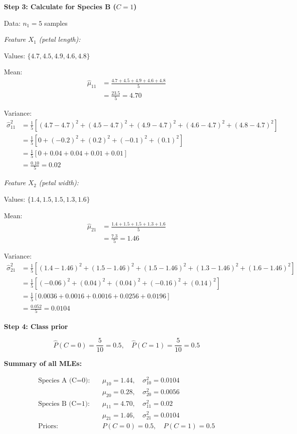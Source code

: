 \documentclass[12pt]{article}
\begin{document}
\begin{solution}
\textbf{Step 3: Calculate for Species B ($C = 1$)}

Data: $n_1 = 5$ samples

\textit{Feature $X_1$ (petal length):}

Values: $\{4.7, 4.5, 4.9, 4.6, 4.8\}$

Mean:
\begin{align}
\hat{\mu}_{11} &= \frac{4.7 + 4.5 + 4.9 + 4.6 + 4.8}{5} \\
&= \frac{23.5}{5} = 4.70
\end{align}

Variance:
\begin{align}
\hat{\sigma}_{11}^2 &= \frac{1}{5}\left[(4.7-4.7)^2 + (4.5-4.7)^2 + (4.9-4.7)^2 + (4.6-4.7)^2 + (4.8-4.7)^2\right] \\
&= \frac{1}{5}\left[0 + (-0.2)^2 + (0.2)^2 + (-0.1)^2 + (0.1)^2\right] \\
&= \frac{1}{5}\left[0 + 0.04 + 0.04 + 0.01 + 0.01\right] \\
&= \frac{0.10}{5} = 0.02
\end{align}

\textit{Feature $X_2$ (petal width):}

Values: $\{1.4, 1.5, 1.5, 1.3, 1.6\}$

Mean:
\begin{align}
\hat{\mu}_{21} &= \frac{1.4 + 1.5 + 1.5 + 1.3 + 1.6}{5} \\
&= \frac{7.3}{5} = 1.46
\end{align}

Variance:
\begin{align}
\hat{\sigma}_{21}^2 &= \frac{1}{5}\left[(1.4-1.46)^2 + (1.5-1.46)^2 + (1.5-1.46)^2 + (1.3-1.46)^2 + (1.6-1.46)^2\right] \\
&= \frac{1}{5}\left[(-0.06)^2 + (0.04)^2 + (0.04)^2 + (-0.16)^2 + (0.14)^2\right] \\
&= \frac{1}{5}\left[0.0036 + 0.0016 + 0.0016 + 0.0256 + 0.0196\right] \\
&= \frac{0.052}{5} = 0.0104
\end{align}

\textbf{Step 4: Class prior}

\[
\hat{P}(C = 0) = \frac{5}{10} = 0.5, \quad \hat{P}(C = 1) = \frac{5}{10} = 0.5
\]

\textbf{Summary of all MLEs:}

\[
\boxed{
\begin{aligned}
\text{Species A (C=0):} \quad &\mu_{10} = 1.44, \quad \sigma_{10}^2 = 0.0104 \\
&\mu_{20} = 0.28, \quad \sigma_{20}^2 = 0.0056 \\
\text{Species B (C=1):} \quad &\mu_{11} = 4.70, \quad \sigma_{11}^2 = 0.02 \\
&\mu_{21} = 1.46, \quad \sigma_{21}^2 = 0.0104 \\
\text{Priors:} \quad &P(C=0) = 0.5, \quad P(C=1) = 0.5
\end{aligned}
}
\]
\end{solution}
\end{document}

